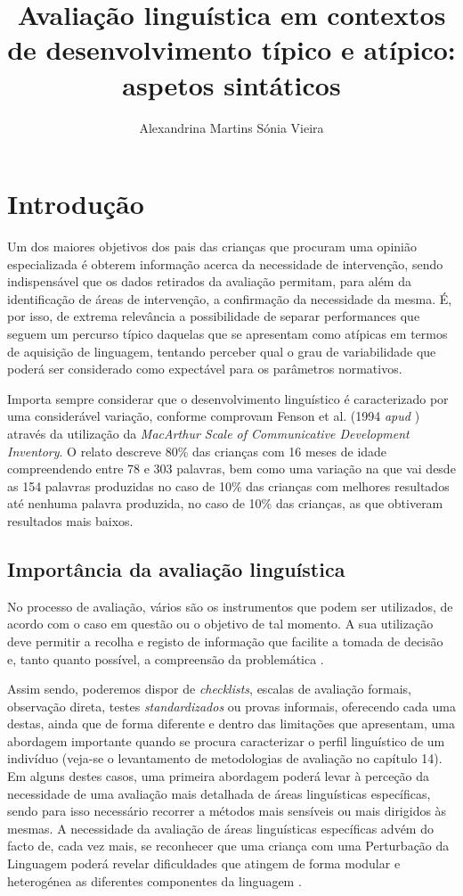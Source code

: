 \documentclass[output=paper]{LSP/langsci}
\author{Alexandrina Martins\affiliation{Universidade de Lisboa, Centro de Linguística e Universidade de Aveiro}\lastand 
Sónia Vieira\affiliation{Universidade de Lisboa, Centro de Linguística}
}
\title{Avaliação linguística em contextos de desenvolvimento típico e atípico: aspetos sintáticos}
\begin{document}
\section{Introdução}
\label{sec:martins_intro}

Um dos maiores objetivos dos pais das crianças que procuram uma opinião especializada é obterem informação acerca da necessidade de intervenção, sendo indispensável que os dados retirados da avaliação permitam, para além da identificação de áreas de intervenção, a confirmação da necessidade da mesma. É, por isso, de extrema relevância a possibilidade de separar performances que seguem um percurso típico daquelas que se apresentam como atípicas em termos de aquisição de linguagem, tentando perceber qual o grau de variabilidade que poderá ser considerado como expectável para os parâmetros normativos.

Importa sempre considerar que o desenvolvimento linguístico é caracterizado por uma considerável variação, conforme comprovam Fenson et al. (1994 \textit{apud} \citealt{bishop1997}) através da utilização da \textit{MacArthur Scale of Communicative Development Inventory}. O relato descreve 80\% das crianças com 16 meses de idade compreendendo entre 78 e 303 palavras, bem como uma variação na  que vai desde as 154 palavras produzidas no caso de 10\% das crianças com melhores resultados até nenhuma palavra produzida, no caso de 10\% das crianças, as que obtiveram resultados mais baixos. 

\subsection{Importância da avaliação linguística}
\label{subsec:martins_importancia}

No processo de avaliação, vários são os instrumentos que podem ser utilizados, de acordo com o caso em questão ou o objetivo de tal momento. A sua utilização deve permitir a recolha e registo de informação que facilite a tomada de decisão e, tanto quanto possível, a compreensão da problemática \citep{coltoncovert2007}. 

Assim sendo, poderemos dispor de \textit{checklists}, escalas de avaliação formais, observação direta, testes \textit{standardizados} ou provas informais, oferecendo cada uma destas, ainda que de forma diferente e dentro das limitações que apresentam, uma abordagem importante quando se procura caracterizar o perfil linguístico de um indivíduo (veja-se o levantamento de metodologias de avaliação no capítulo 14). Em alguns destes casos, uma primeira abordagem poderá levar à perceção da necessidade de uma avaliação mais detalhada de áreas linguísticas específicas, sendo para isso necessário recorrer a métodos mais sensíveis ou mais dirigidos às mesmas. A necessidade da avaliação de áreas linguísticas específicas advém do facto de, cada vez mais, se reconhecer que uma criança com uma Perturbação da Linguagem poderá revelar dificuldades que atingem de forma modular e heterogénea as diferentes componentes da linguagem \citep{bishop1997}. 
\end{document}
